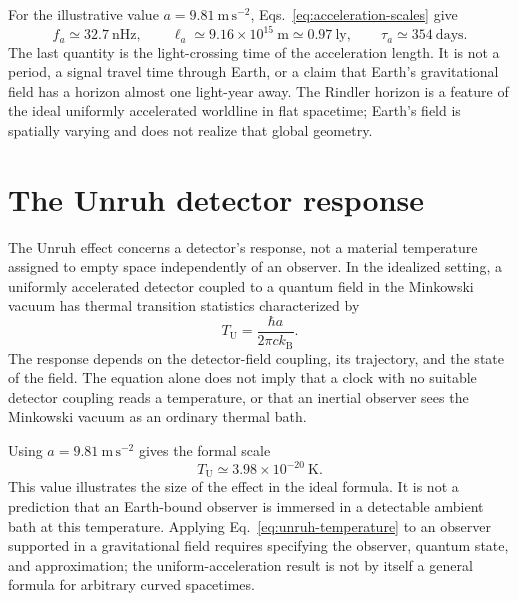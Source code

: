 \documentclass[12pt]{article}
\begin{document}
For the illustrative value $a=9.81\ \mathrm{m\,s^{-2}}$, Eqs.~\eqref{eq:acceleration-scales} give
\begin{equation}
  f_a\simeq32.7\ \mathrm{nHz},
  \qquad
  \ell_a\simeq9.16\times10^{15}\ \mathrm{m}\simeq0.97\ \mathrm{ly},
  \qquad
  \tau_a\simeq354\ \mathrm{days}.
  \label{eq:earth-acceleration-scales}
\end{equation}
The last quantity is the light-crossing time of the acceleration length. It is not a period, a signal travel time through Earth, or a claim that Earth's gravitational field has a horizon almost one light-year away. The Rindler horizon is a feature of the ideal uniformly accelerated worldline in flat spacetime; Earth's field is spatially varying and does not realize that global geometry.

\section{The Unruh detector response}

The Unruh effect concerns a detector's response, not a material temperature assigned to empty space independently of an observer. In the idealized setting, a uniformly accelerated detector coupled to a quantum field in the Minkowski vacuum has thermal transition statistics characterized by \cite{Unruh}
\begin{equation}
  T_{\mathrm{U}}
  =\frac{\hbar a}{2\pi c k_{\mathrm{B}}}.
  \label{eq:unruh-temperature}
\end{equation}
The response depends on the detector-field coupling, its trajectory, and the state of the field. The equation alone does not imply that a clock with no suitable detector coupling reads a temperature, or that an inertial observer sees the Minkowski vacuum as an ordinary thermal bath.

Using $a=9.81\ \mathrm{m\,s^{-2}}$ gives the formal scale
\begin{equation}
  T_{\mathrm{U}}\simeq3.98\times10^{-20}\ \mathrm{K}.
  \label{eq:earth-unruh-temperature}
\end{equation}
This value illustrates the size of the effect in the ideal formula. It is not a prediction that an Earth-bound observer is immersed in a detectable ambient bath at this temperature. Applying Eq.~\eqref{eq:unruh-temperature} to an observer supported in a gravitational field requires specifying the observer, quantum state, and approximation; the uniform-acceleration result is not by itself a general formula for arbitrary curved spacetimes.
\end{document}
